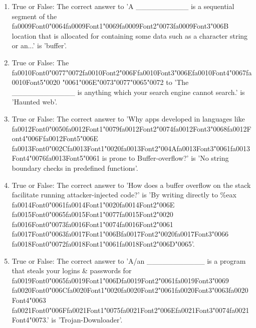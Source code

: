 \documentclass[12pt]{article}
\begin{document}
\begin{enumerate}[label=\arabic*.]
\item True or False: The correct answer to 'A \_\_\_\_\_\_\_\_\_\_ is a sequential segment of the {\csname fa0009Font0\endcsname\char"0064}{\csname fa0009Font1\endcsname\char"0069}{\csname fa0009Font2\endcsname\char"0073}{\csname fa0009Font3\endcsname\char"006B} location that is allocated for containing some data such as a character string or an...' is 'buffer'.
\item True or False: The {\csname fa0010Font0\endcsname\char"0077}{\char"0072}{\csname fa0010Font2\endcsname\char"006F}{\csname fa0010Font3\endcsname\char"006E}{\csname fa0010Font4\endcsname\char"0067}{\csname fa0010Font5\endcsname\char"0020} {\char"0061}{\char"006E}{\char"0073}{\char"0077}{\char"0065}{\char"0072} to 'The \_\_\_\_\_\_\_\_\_\_\_\_ is anything which your search engine cannot search.' is 'Haunted web'.
\item True or False: The correct answer to 'Why apps developed in languages like {\csname fa0012Font0\endcsname\char"0050}{\csname fa0012Font1\endcsname\char"0079}{\csname fa0012Font2\endcsname\char"0074}{\csname fa0012Font3\endcsname\char"0068}{\csname fa0012Font4\endcsname\char"006F}{\csname fa0012Font5\endcsname\char"006E} {\csname fa0013Font0\endcsname\char"002C}{\csname fa0013Font1\endcsname\char"0020}{\csname fa0013Font2\endcsname\char"004A}{\csname fa0013Font3\endcsname\char"0061}{\csname fa0013Font4\endcsname\char"0076}{\csname fa0013Font5\endcsname\char"0061} is prone to Buffer-overflow?' is 'No string boundary checks in predefined functions'.
\item True or False: The correct answer to 'How does a buffer overflow on the stack facilitate running attacker-injected code?' is 'By writing directly to \%eax {\csname fa0014Font0\endcsname\char"0061}{\csname fa0014Font1\endcsname\char"0020}{\csname fa0014Font2\endcsname\char"006E} {\csname fa0015Font0\endcsname\char"0065}{\csname fa0015Font1\endcsname\char"0077}{\csname fa0015Font2\endcsname\char"0020} {\csname fa0016Font0\endcsname\char"0073}{\csname fa0016Font1\endcsname\char"0074}{\csname fa0016Font2\endcsname\char"0061} {\csname fa0017Font0\endcsname\char"0063}{\csname fa0017Font1\endcsname\char"006B}{\csname fa0017Font2\endcsname\char"0020}{\csname fa0017Font3\endcsname\char"0066} {\csname fa0018Font0\endcsname\char"0072}{\csname fa0018Font1\endcsname\char"0061}{\csname fa0018Font2\endcsname\char"006D}{\char"0065}'.
\item True or False: The correct answer to 'A/an \_\_\_\_\_\_\_\_\_\_\_ is a program that steals your logins \& passwords for {\csname fa0019Font0\endcsname\char"0065}{\csname fa0019Font1\endcsname\char"006D}{\csname fa0019Font2\endcsname\char"0061}{\csname fa0019Font3\endcsname\char"0069} {\csname fa0020Font0\endcsname\char"006C}{\csname fa0020Font1\endcsname\char"0020}{\csname fa0020Font2\endcsname\char"0061}{\csname fa0020Font3\endcsname\char"0063}{\csname fa0020Font4\endcsname\char"0063} {\csname fa0021Font0\endcsname\char"006F}{\csname fa0021Font1\endcsname\char"0075}{\csname fa0021Font2\endcsname\char"006E}{\csname fa0021Font3\endcsname\char"0074}{\csname fa0021Font4\endcsname\char"0073}.' is 'Trojan-Downloader'.

\end{enumerate}
\end{document}
